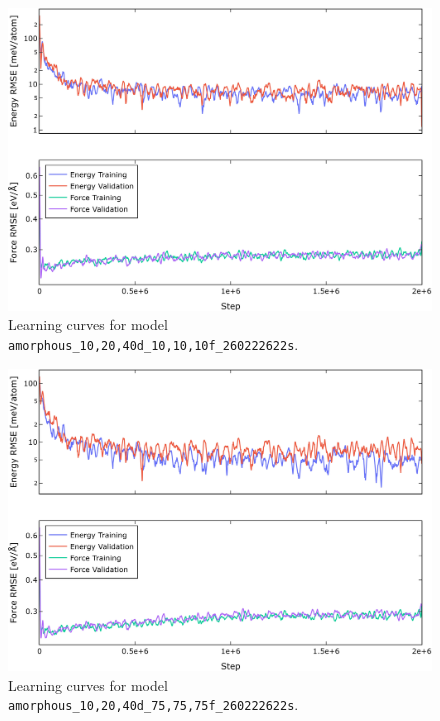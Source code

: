 \begin{figure}
  \begin{center}
    \includegraphics[width=.8\textwidth]{
      asset/amorphous_10,20,40d_10,10,10f_260222622s_energy_force_l_curve.jpg
    }
  \end{center}
  \caption{Learning curves for model \texttt{amorphous\_10,20,40d\_10,10,10f\_260222622s}.}
  \label{fig:amorphous_10,20,40d_10,10,10f_260222622s-learning-curves}
\end{figure}

\begin{figure}
  \begin{center}
    \includegraphics[width=.8\textwidth]{
      asset/amorphous_10,20,40d_75,75,75f_260222622s_energy_force_l_curve.jpg
    }
  \end{center}
  \caption{Learning curves for model \texttt{amorphous\_10,20,40d\_75,75,75f\_260222622s}.}
  \label{fig:amorphous_10,20,40d_75,75,75f_260222622s-learning-curves}
\end{figure}

